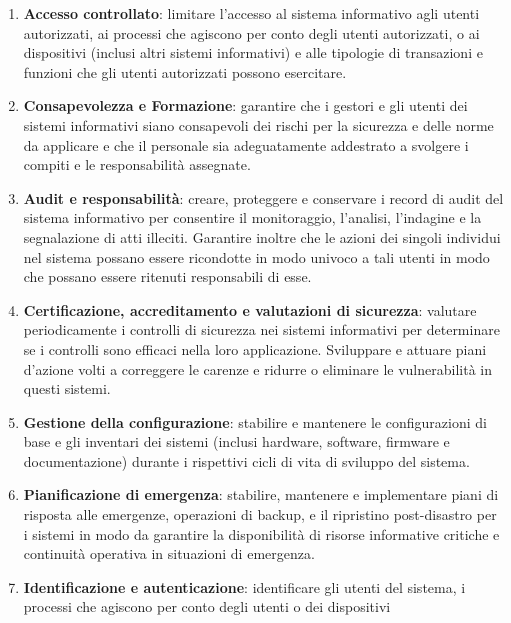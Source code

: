 \begin{enumerate}
      \item \textbf{Accesso controllato}: limitare l'accesso al sistema informativo
            agli utenti autorizzati, ai processi che agiscono per conto degli utenti
            autorizzati, o ai dispositivi (inclusi altri sistemi informativi) e alle
            tipologie di transazioni e funzioni che gli utenti autorizzati possono
            esercitare.
      \item \textbf{Consapevolezza e Formazione}: garantire che i gestori e gli
            utenti dei sistemi informativi siano consapevoli dei rischi
            per la sicurezza e delle norme da applicare e che il personale sia
            adeguatamente addestrato a svolgere i compiti e le responsabilità assegnate.
      \item \textbf{Audit e responsabilità}: creare, proteggere e conservare i
            record di audit del sistema informativo per consentire il monitoraggio,
            l'analisi, l'indagine e la segnalazione di atti illeciti. Garantire inoltre
            che le azioni dei singoli individui  nel sistema possano essere ricondotte
            in modo univoco a tali utenti in modo che possano essere ritenuti responsabili
            di esse.
      \item \textbf{Certificazione, accreditamento e valutazioni di sicurezza}:
            valutare periodicamente i controlli di sicurezza nei sistemi informativi
            per determinare se i controlli sono efficaci nella loro
            applicazione. Sviluppare e attuare piani d'azione volti a correggere le
            carenze e ridurre o eliminare le vulnerabilità in questi sistemi.
      \item \textbf{Gestione della configurazione}: stabilire e mantenere le
            configurazioni di base e gli inventari dei sistemi
            (inclusi hardware, software, firmware e documentazione) durante i
            rispettivi cicli di vita di sviluppo del sistema.
      \item \textbf{Pianificazione di emergenza}: stabilire, mantenere e
            implementare piani di risposta alle emergenze, operazioni di backup,
            e il ripristino post-disastro per i sistemi in modo da garantire la
            disponibilità di risorse informative critiche e continuità operativa
            in situazioni di emergenza.
      \item \textbf{Identificazione e autenticazione}: identificare gli utenti
            del sistema, i processi che agiscono per conto degli utenti o dei dispositivi

\end{enumerate}
